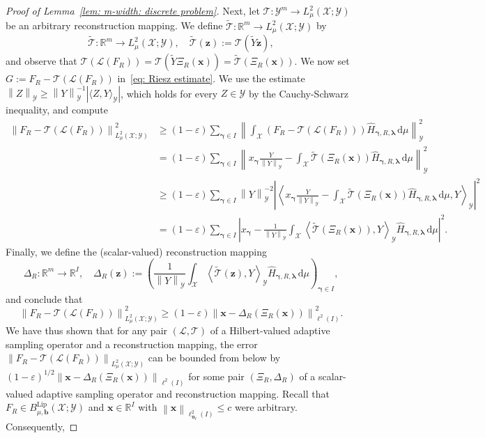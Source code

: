 \documentclass[namedate,webpdf]{ima-authoring-template-blank}
\newcommand*{\Lip}{\mathrm{Lip}}  %
\def\D{\,\mathrm{d}}
\newcommand*{\nm}[1]{{\left\|#1\right \|}}
\newcommand{\abs}[1]{\left|#1\right|}
\newcommand{\absd}[1]{|#1|}    %
\newcommand*{\ip}[2]{\left\langle #1, #2 \right\rangle}
\newcommand*{\ipd}[2]{\langle #1, #2 \rangle}    %
\numberwithin{counter}{section}
\numberwithin{equation}{section}
\theoremstyle{plain}
\theoremstyle{definition}
\newcommand*{\cL}{\mathcal{L}}
\newcommand*{\cT}{\mathcal{T}}
\newcommand*{\cX}{\mathcal{X}}
\newcommand*{\cY}{\mathcal{Y}}
\newcommand*{\bbR}{\mathbb{R}}
\newcommand*{\wtY}{\widetilde{Y}}
\newcommand*{\whH}{\widehat{H}}
\theoremstyle{thmstyletwo}
\begin{document}
\begin{proof}[Proof of Lemma~\ref{lem: m-width: discrete problem}]
    Next, let \(\cT: \cY^m \to L_{\mu}^2(\cX; \cY)\) be an arbitrary reconstruction mapping. We define \(\widetilde{\cT}: \bbR^m \to L_{\mu}^2(\cX; \cY)\) by 
    \[
    \widetilde{\cT}: \bbR^m \to L_{\mu}^2(\cX; \cY), \quad 
    \widetilde{\cT}(\bm{z}) := \cT(\wtY \bm{z}),
    \]
    and observe that
    \(
    \cT(\cL(F_R)) = \cT(\widetilde{Y} \Xi_R(\bm{x})) = \widetilde{\cT}(\Xi_R(\bm{x})).
    \)
    We now set \(G := F_R - \cT(\cL(F_R))\) in~\eqref{eq: Riesz estimate}. We use the estimate \(\nm{Z}_{\cY} \geq \nm{Y}_{\cY}^{-1} \absd{\ipd{Z}{Y}_{\cY}}\), which holds for every \(Z \in \cY\) by the Cauchy-Schwarz inequality, and compute
    \begin{align*}
        \nm{F_R - \cT(\cL(F_R))}_{L_{\mu}^2(\cX; \cY)}^2 
        &\geq (1-\varepsilon) \sum_{\bm{\gamma} \in I} \nm{\int_{\cX} \left(F_R - \cT(\cL(F_R))\right) \whH_{\bm{\gamma}, R, \bm{\lambda}} \D \mu}_{\cY}^2  \\
        &= (1-\varepsilon) \sum_{\bm{\gamma} \in I} \nm{x_{\bm{\gamma}} \frac{Y}{\nm{Y}_{\cY}} - \int_{\cX} \widetilde{\cT}(\Xi_R(\bm{x})) \whH_{\bm{\gamma}, R, \bm{\lambda}} \D \mu}_{\cY}^2 \\
        &\geq (1-\varepsilon) \sum_{\bm{\gamma} \in I}
        \nm{Y}_{\cY}^{-2} \abs{\ip{x_{\bm{\gamma}} \frac{Y}{\nm{Y}_{\cY}} - \int_{\cX} \widetilde{\cT}(\Xi_R(\bm{x})) \whH_{\bm{\gamma}, R, \bm{\lambda}} \D \mu}{Y}_{\cY}}^2 \\
        &= (1-\varepsilon) \sum_{\bm{\gamma} \in I}
        \abs{x_{\bm{\gamma}} - \frac{1}{\nm{Y}_{\cY}} \int_{\cX} \ip{\widetilde{\cT}(\Xi_R(\bm{x}))}{Y}_{\cY} \whH_{\bm{\gamma}, R, \bm{\lambda}} \D \mu}^2.
    \end{align*}
    Finally, we define the (scalar-valued) reconstruction mapping
    \[
    \Delta_R: \bbR^m \to \bbR^I, \quad 
    \Delta_R(\bm{z}) := \left(\frac{1}{\nm{Y}_{\cY}} \int_{\cX} \ip{\widetilde{\cT}(\bm{z})}{Y}_{\cY} \whH_{\bm{\gamma}, R, \bm{\lambda}} \D \mu \right)_{\bm{\gamma} \in I},
    \]
    and conclude that
    \[
    \nm{F_R - \cT(\cL(F_R))}_{L_{\mu}^2(\cX; \cY)}^2 \geq (1-\varepsilon) \nm{\bm{x} - \Delta_R(\Xi_R(\bm{x}))}_{\ell^2(I)}^2.
    \]
We have thus shown that for any pair \((\cL, \cT)\) of a Hilbert-valued adaptive sampling operator and a reconstruction mapping, the error \(\nm{F_R - \cT(\cL(F_R))}_{L_{\mu}^2(\cX; \cY)}\) can be bounded from below by \((1-\varepsilon)^{1/2} \nm{\bm{x} - \Delta_R(\Xi_R(\bm{x}))}_{\ell^2(I)}\) for some pair \((\Xi_R, \Delta_R)\) of a scalar-valued adaptive sampling operator and reconstruction mapping. Recall that \(F_R \in B_{\mu, \bm{b}}^{\Lip}(\cX; \cY)\) and \(\bm{x} \in \bbR^I\) with \(\nm{\bm{x}}_{\ell_{\bm{u}_I}^2(I)} \leq c\) were arbitrary. Consequently,

\end{proof}
\end{document}
